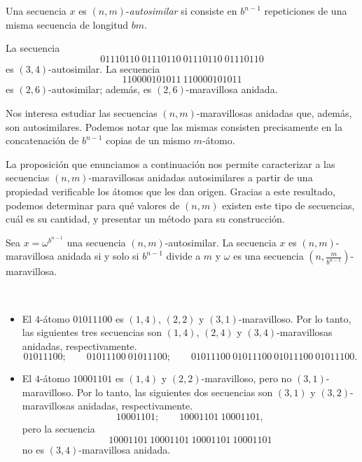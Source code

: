 \begin{definition}
	Una secuencia $x$ es $(n,m)$-\emph{autosimilar} si consiste en $b^{n-1}$
	repeticiones de una misma secuencia de longitud $bm$.
\end{definition}

\begin{example}
	La secuencia \[ 01110110\ 01110110\ 01110110\ 01110110 \] es
	$(3,4)$-autosimilar.
	La secuencia \[ 110000101011 \ 110000101011 \] es $(2,6)$-autosimilar; además,
	es $(2,6)$-maravillosa anidada.
\end{example}

Nos interesa estudiar las secuencias $(n,m)$-maravillosas anidadas que, además,
son autosimilares.
Podemos notar que las mismas consisten precisamente en la concatenación
de $b^{n-1}$ copias de un mismo $m$-átomo.

La proposición que enunciamos a continuación nos permite caracterizar a
las secuencias $(n,m)$-maravillosas anidadas autosimilares a
partir de una propiedad verificable los átomos que les dan origen.
Gracias a este resultado, podemos determinar para qué valores de $(n,m)$ existen
este tipo de secuencias, cuál es su cantidad, y presentar un método para su
construcción.

\begin{proposition}
	\label{proposition:autosimilar-nm-characterization}
	Sea $x = \omega^{b^{n-1}}$ una secuencia $(n,m)$-autosimilar.
	La secuencia $x$ es $(n,m)$-maravillosa anidada si y solo si $b^{n-1}$
	divide a $m$ y $\omega$
	es una secuencia $\left( n, \frac{m}{b^{n-1}} \right)$-maravillosa.
\end{proposition}

\begin{examples}\ %
	\begin{itemize}
		\item El $4$-átomo $01011100$ es $(1,4)$, $(2,2)$ y
		      $(3,1)$-maravilloso.
		      Por lo tanto, las siguientes tres secuencias son $(1,4)$, $(2,4)$ y
		      $(3,4)$-maravillosas anidadas, respectivamente.
		      \[ 01011100; \qquad 01011100\ 01011100; \qquad 01011100\
			      01011100\ 01011100\ 01011100.
		      \]
		\item El $4$-átomo $10001101$ es $(1,4)$ y $(2,2)$-maravilloso,
		      pero no $(3,1)$-maravilloso.
		      Por lo tanto, las siguientes dos secuencias son $(3,1)$ y $(3,2)$-maravillosas
		      anidadas, respectivamente.
		      \[ 10001101; \qquad 10001101\ 10001101,
		      \]
		      pero la secuencia
		      \[ 10001101\ 10001101\ 10001101\
			      10001101 \]
		      no es $(3,4)$-maravillosa anidada.
	\end{itemize}
\end{examples}

